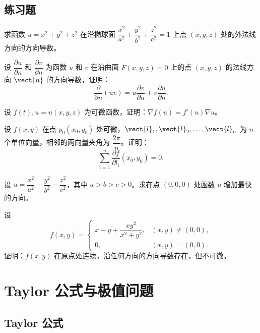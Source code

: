 \subsection{练习题}
\begin{xexercise}[1]
求函数 $u=x^2+y^2+z^2$ 在沿椭球面 $\dfrac{x^2}{a^2}+\dfrac{y^2}{b^2}+\dfrac{z^2}{c^2}=1$ 上点 $(x,y,z)$ 处的外法线方向的方向导数。
\end{xexercise}

\begin{xexercise}[2]
设 $\dfrac{\partial u}{\partial n}$ 和 $\dfrac{\partial v}{\partial n}$ 为函数 $u$ 和 $v$ 在沿曲面 $F(x,y,z)=0$ 上的点 $(x,y,z)$ 的法线方向 $\vect{n}$ 的方向导数，证明：
  \[
    \frac{\partial}{\partial n}(uv)=u\frac{\partial v}{\partial n}+v\frac{\partial u}{\partial n}.
  \]
\end{xexercise}

\begin{xexercise}[3]
设 $f(t),u=u(x,y,z)$ 为可微函数，证明：$\nabla f(u)=f'(u)\nabla u$。
\end{xexercise}

\begin{xexercise}[4]
设 $f(x,y)$ 在点 $p_0(x_0,y_0)$ 处可微，$\vect{l}_1,\vect{l}_2,\ldots,\vect{l}_n$ 为 $n$ 个单位向量，相邻的两向量夹角为 $\dfrac{2\pi}{n}$。证明：
  \[
    \sum_{i=1}^n\frac{\partial f}{\partial l_i}(x_0,y_0)=0.
  \]
\end{xexercise}

\begin{xexercise}[5]
设 $u=\dfrac{x^2}{a^2}+\dfrac{y^2}{b^2}-\dfrac{z^2}{c^2}$，其中 $a>b>c>0$。求在点 $(0,0,0)$ 处函数 $u$ 增加最快的方向。
\end{xexercise}

\begin{xexercise}[6]
设
  \[
    f(x,y)=\begin{cases}
      x-y+\dfrac{xy^2}{x^2+y^2},&(x,y)\ne(0,0),\\[6pt]
      0,&(x,y)=(0,0).
    \end{cases}
  \]
  证明：$f(x,y)$ 在原点处连续，沿任何方向的方向导数存在，但不可微。
\end{xexercise}
\section{Taylor 公式与极值问题}

\subsection{Taylor 公式}


